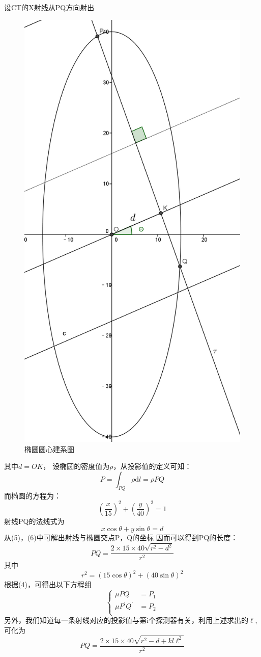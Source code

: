 \documentclass[withoutpreface,bwprint]{cumcmthesis} %
\begin{document}
设CT的X射线从PQ方向射出
\begin{figure}[H]
\centering
\includegraphics[width=.6\textwidth]{3.png}
\caption{椭圆圆心建系图}
\end{figure}
其中$d=OK$，
设椭圆的密度值为$\rho$，从投影值的定义可知：
\begin{equation}
P=\int_{PQ}{\rho}\mathrm{d}l={\rho}PQ
\end{equation}
而椭圆的方程为：
\begin{equation}
(\frac{x}{15})^2+(\frac{y}{40})^2=1
\end{equation}
射线PQ的法线式为
\begin{equation}
x\cos{\theta}+y\sin{\theta}=d
\end{equation}
从(5)，(6)中可解出射线与椭圆交点P，Q的坐标
因而可以得到PQ的长度：
\begin{equation}
PQ=\frac{2 \times 15\times 40\sqrt{r^2-d^2}}{r^2}
\end{equation}
其中
\begin{displaymath}
r^2=(15\cos{\theta})^2+(40\sin{ \theta})^2
\end{displaymath}
根据(4)，可得出以下方程组
 \begin{equation}
\left\{
\begin{array}{rl}
{\mu}PQ&=P_1\\

{\mu}P^{'}Q^{'}&=P_2\\
\end{array}
\right.
\end{equation}
另外，我们知道每一条射线对应的投影值与第i个探测器有关，利用上述求出的$\ell$,可化为
\begin{equation}
PQ=\frac{2 \times 15\times 40\sqrt{r^2-d+kl{\ell}^2}}{r^2}
\end{equation}
\end{document}
